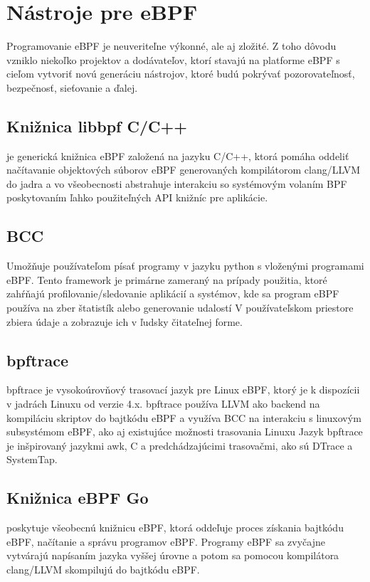\section{Nástroje pre eBPF}
Programovanie eBPF je neuveriteľne výkonné, ale aj zložité. Z toho dôvodu vzniklo niekoľko projektov a dodávateľov, ktorí stavajú na platforme eBPF s cieľom vytvoriť novú generáciu nástrojov, ktoré budú pokrývať pozorovateľnosť, bezpečnosť, sieťovanie a ďalej.

\subsection*{Knižnica libbpf C/C++}
je generická knižnica eBPF založená na jazyku C/C++, ktorá pomáha oddeliť načítavanie objektových súborov eBPF generovaných kompilátorom clang/LLVM do jadra a vo všeobecnosti abstrahuje interakciu so systémovým volaním BPF poskytovaním ľahko použiteľných API knižníc pre aplikácie.

\subsection*{BCC}
Umožňuje používateľom písať programy v jazyku python s vloženými programami eBPF.  
Tento framework je primárne zameraný na prípady použitia, ktoré zahŕňajú profilovanie/sledovanie aplikácií a systémov, kde sa program eBPF používa na zber štatistík alebo generovanie udalostí
V používateľskom priestore zbiera údaje a zobrazuje ich v ľudsky čitateľnej forme. 

\subsection*{bpftrace}
bpftrace je vysokoúrovňový trasovací jazyk pre Linux eBPF, ktorý je k dispozícii v jadrách Linuxu od verzie 4.x. 
bpftrace používa LLVM ako backend na kompiláciu skriptov do bajtkódu eBPF a využíva BCC na interakciu s linuxovým subsystémom eBPF, ako aj existujúce možnosti trasovania Linuxu
Jazyk bpftrace je inšpirovaný jazykmi awk, C a predchádzajúcimi trasovačmi, ako sú DTrace a SystemTap.

\subsection*{Knižnica eBPF Go}
poskytuje všeobecnú knižnicu eBPF, ktorá oddeľuje proces získania bajtkódu eBPF, načítanie a správu programov eBPF. 
Programy eBPF sa zvyčajne vytvárajú napísaním jazyka vyššej úrovne a potom sa pomocou kompilátora clang/LLVM skompilujú do bajtkódu eBPF.

